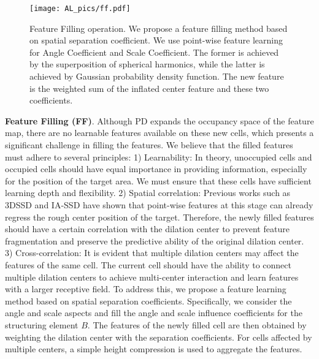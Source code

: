 \begin{figure}[t]
	\begin{center}
		\texttt{[image: AL\_pics/ff.pdf]}
	\end{center}
	\vspace{-0.3cm}
	\caption{Feature Filling operation. We propose a feature filling method based on spatial separation coefficient. We use point-wise feature learning for Angle Coefficient and Scale Coefficient. The former is achieved by the superposition of spherical harmonics, while the latter is achieved by Gaussian probability density function. The new feature is the weighted sum of the inflated center feature and these two coefficients.}
	\label{fig5}
	\vspace{-0.3cm}
\end{figure}

\textbf{Feature Filling (FF)}. Although PD expands the occupancy space of the feature map, there are no learnable features available on these new cells, which presents a significant challenge in filling the features. We believe that the filled features must adhere to several principles: 1) Learnability: In theory, unoccupied cells and occupied cells should have equal importance in providing information, especially for the position of the target area. We must ensure that these cells have sufficient learning depth and flexibility. 2) Spatial correlation: Previous works such as 3DSSD and IA-SSD have shown that point-wise features at this stage can already regress the rough center position of the target. Therefore, the newly filled features should have a certain correlation with the dilation center to prevent feature fragmentation and preserve the predictive ability of the original dilation center. 3) Cross-correlation: It is evident that multiple dilation centers may affect the features of the same cell. The current cell should have the ability to connect multiple dilation centers to achieve multi-center interaction and learn features with a larger receptive field. To address this, we propose a feature learning method based on spatial separation coefficients. Specifically, we consider the angle and scale aspects and fill the angle and scale influence coefficients for the structuring element $B$. The features of the newly filled cell are then obtained by weighting the dilation center with the separation coefficients. For cells affected by multiple centers, a simple height compression is used to aggregate the features.

